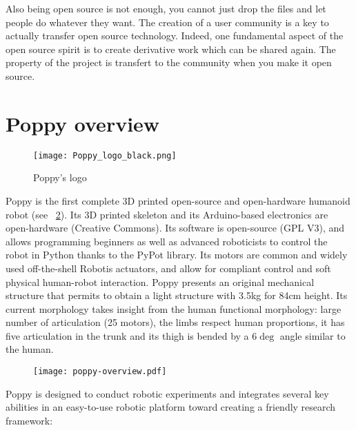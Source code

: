 Also being open source is not enough, you cannot just drop the files and let people do whatever they want. The creation of a user community is a key to actually transfer open source technology. Indeed, one fundamental aspect of the open source spirit is to create derivative work which can be shared again. The property of the project is transfert to the community when you make it open source.



\section{Poppy overview} %
\label{sec:poppy_overview}
\begin{figure}[tb]
    \begin{center}
        \texttt{[image: Poppy\_logo\_black.png]}
    \end{center}
    \caption{Poppy's logo}
    \label{fig:poppy_logo}
\end{figure}

Poppy is the first complete 3D printed open-source and open-hardware humanoid robot (see \figurename~\ref{fig:poppyv0.1_overview}). Its 3D printed skeleton and its Arduino-based electronics are open-hardware (Creative Commons). Its software is open-source (GPL V3), and allows programming beginners as well as advanced roboticists to control the robot in Python thanks to the PyPot library. Its motors are common and widely used off-the-shell Robotis actuators, and allow for compliant control and soft physical human-robot interaction. Poppy presents an original mechanical structure that permits to obtain a light structure with 3.5kg for 84cm height.
Its current morphology takes insight from the human functional morphology: large number of articulation (25 motors), the limbs respect human proportions, it has five articulation in the trunk and its thigh is bended by a $6\deg$ angle similar to the human.

\begin{figure}[tb]
    \begin{center}
        \texttt{[image: poppy-overview.pdf]}
    \end{center}
    \caption{}
    \label{fig:poppyv0.1_overview}
\end{figure}

Poppy is designed to conduct robotic experiments and integrates several key abilities in an easy-to-use robotic platform toward creating a friendly research framework:


